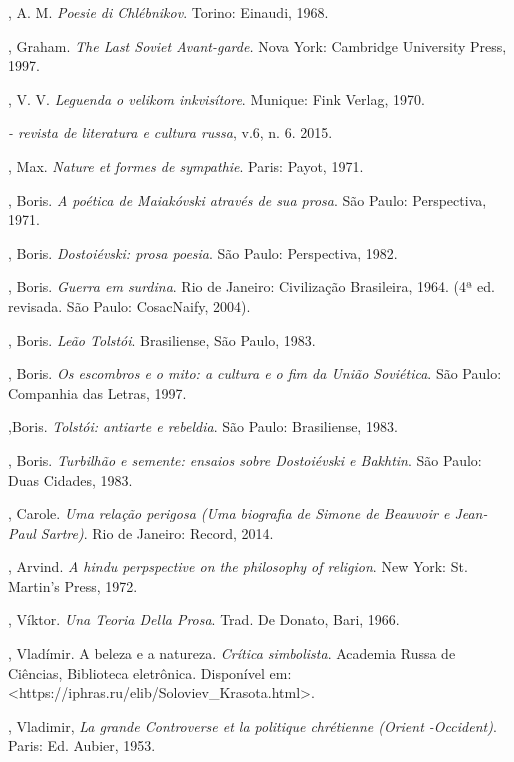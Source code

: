 , A. M. \emph{Poesie di Chlébnikov}. Torino: Einaudi, 1968.

, Graham. \emph{The Last Soviet Avant-garde.} Nova York:
Cambridge University Press, 1997.

, V. V. \emph{Leguenda o velikom inkvisítore}. Munique: Fink
Verlag, 1970.

\emph{ - revista de literatura e cultura russa}, v.6, n. 6. 2015.

, Max. \emph{Nature et formes de sympathie}. Paris:
Payot, 1971.

, Boris. \emph{A poética de Maiakóvski através de sua prosa}. São Paulo: Perspectiva, 1971.

, Boris. \emph{Dostoiévski: prosa poesia}. São Paulo: Perspectiva, 1982.

, Boris. \emph{Guerra em surdina}. Rio de Janeiro: Civilização Brasileira, 1964. (4ª ed.
  revisada. São Paulo: CosacNaify, 2004).

, Boris. \emph{Leão Tolstói}. Brasiliense, São Paulo, 1983.

, Boris. \emph{Os escombros e o mito: a cultura e o fim da União Soviética}. São Paulo: Companhia das Letras, 1997.

,Boris. \emph{Tolstói: antiarte e rebeldia}. São Paulo: Brasiliense, 1983.

, Boris. \emph{Turbilhão e semente: ensaios sobre Dostoiévski e Bakhtin}. São Paulo: Duas Cidades, 1983.

, Carole. \emph{Uma relação perigosa (Uma biografia
de Simone de Beauvoir e Jean-Paul Sartre)}. Rio de Janeiro: Record, 2014.

, Arvind. \emph{A hindu perpspective on the philosophy of
religion}. New York: St. Martin's Press, 1972.

, Víktor. \emph{Una Teoria Della Prosa}. Trad. De Donato,
Bari, 1966.

, Vladímir. A beleza e a natureza. \emph{Crítica simbolista}. Academia Russa de Ciências,
  Biblioteca eletrônica. Disponível em: \textless{}https://iphras.ru/elib/Soloviev\_Krasota.html\textgreater{}.

, Vladimir, \emph{La grande Controverse et la politique
chrétienne (Orient -Occident)}. Paris: Ed. Aubier, 1953.

